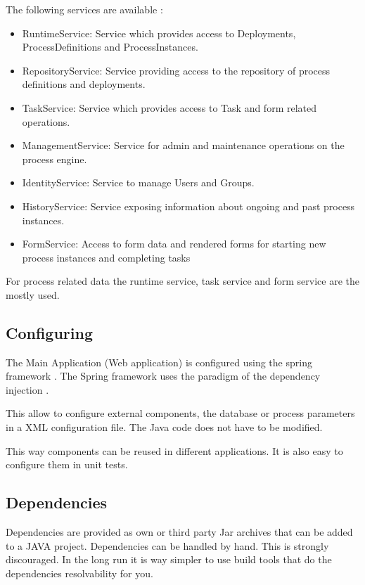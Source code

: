 \documentclass[paper=a4,twoside=false,BCOR=0mm,DIV=calc,fontsize=12pt]{scrartcl}
\begin{document}
The following services are available \cite{activitijavadoc}:
\begin{itemize}
 \item RuntimeService: Service which provides access to Deployments, ProcessDefinitions and ProcessInstances. 
 \item RepositoryService: Service providing access to the repository of process definitions and deployments. 
 \item TaskService: Service which provides access to Task and form related operations. 
 \item ManagementService: Service for admin and maintenance operations on the process engine. 
 \item IdentityService: Service to manage Users and Groups. 
 \item HistoryService: Service exposing information about ongoing and past process instances. 
 \item FormService: Access to form data and rendered forms for starting new process instances and completing tasks
\end{itemize}

For process related data the runtime service, task service and form service are the mostly used.


\subsection{Configuring}
The Main Application (Web application) is configured using the spring framework \cite{spring}. The Spring framework uses the paradigm of the dependency injection \cite{dependencyInection}.

This allow to configure external components, the database or process parameters in a XML configuration file. The Java code does not have to be modified. 

This way components can be reused in different applications. It is also easy to configure them in unit tests.

\subsection{Dependencies}
Dependencies are provided as own or third party Jar archives that can be added to a JAVA project.
Dependencies can be handled by hand. This is strongly discouraged. In the long run it is way simpler to use build tools that do the dependencies resolvability for you.
\end{document}

